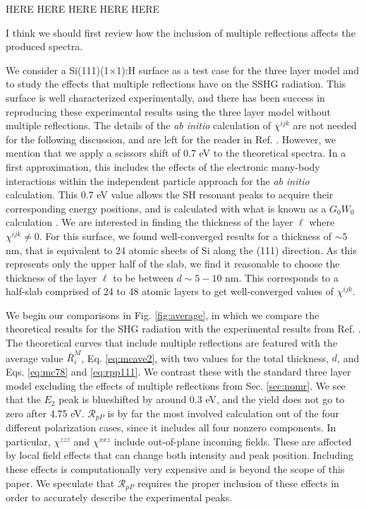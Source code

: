 {\color{red} HERE HERE HERE HERE HERE}

I think we should first review how the inclusion of multiple reflections affects the produced spectra. 

We consider a Si(111)(1$\times$1):H surface as a test case for the three layer model and to study the effects that multiple reflections have on the SSHG radiation. This surface is well characterized experimentally,\cite{mitchellSS01, mejiaPRB02, bergfeldPRL04} and there has been success in reproducing these experimental results using the three layer model without multiple reflections.\cite{andersonPRB16} The details of the \emph{ab initio} calculation of $\chi^{ijk}$ are not needed for the following discussion, and are left for the reader in Ref. \cite{andersonPRB16}. However, we mention that we apply a scissors shift of 0.7 eV to the theoretical spectra. In a first approximation, this includes the effects of the electronic many-body interactions within the independent particle approach for the \emph{ab initio} calculation. This 0.7 eV value allows the SH resonant peaks to acquire their corresponding energy positions, and is calculated with what is known as a $G_{0}W_{0}$ calculation \cite{andersonPRB16}. We are interested in finding the thickness of the layer $\ell$ where $\chi^{ijk} \ne 0$. For this surface, we found well-converged results for a thickness of $\sim 5$ nm, that is equivalent to 24 atomic sheets of Si along the (111) direction. As this represents only the upper half of the slab, we find it reasonable to choose the thickness of the layer $\ell$ to be between $d\sim 5-10$ nm. This corresponds to a half-slab comprised of 24 to 48 atomic layers to get well-converged values of $\chi^{ijk}$.

We begin our comparisons in Fig. \ref{fig:average}, in which we compare the theoretical results for the SHG radiation with the experimental results from Ref. \cite{mejiaPRB02}. The theoretical curves that include multiple reflections are featured with the average value $\bar{R}^{M}_{i}$, Eq. \eqref{eq:mcave2}, with two values for the total thickness, $d$, and Eqs. \eqref{eq:mc78} and \eqref{eq:rpp111}. We contrast these with the standard three layer model excluding the effects of multiple reflections from Sec. \ref{sec:nomr}. We see that the $E_{2}$ peak is blueshifted by around 0.3 eV, and the yield does not go to zero after 4.75 eV. $\mathcal{R}_{pP}$ is by far the most involved calculation out of the four different polarization cases, since it includes all four nonzero components. In particular, $\chi^{zzz}$ and $\chi^{xxz}$ include out-of-plane incoming fields. These are affected by local field effects that can change both intensity and peak position.\cite{tancognedejean:tel-01235611} Including these effects is computationally very expensive and is beyond the scope of this paper. We speculate that $\mathcal{R}_{pP}$ requires the proper inclusion of these effects in order to accurately describe the experimental peaks.

